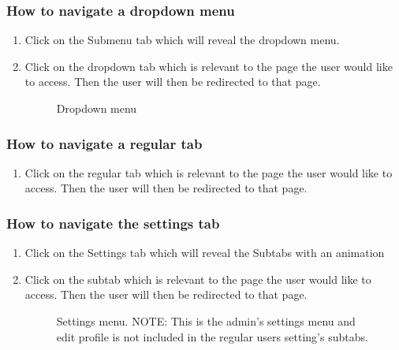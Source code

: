 \documentclass[14pt, a4paper]{article}
\begin{document}
	\subsubsection{How to navigate a dropdown menu}
		\begin{enumerate}
			\item Click on the Submenu tab which will reveal the dropdown menu.
			\item Click on the dropdown tab which is relevant to the page the user would like to access. Then the user will then be redirected to that page.
			\begin{figure}[H]
				\centerline{}
				\caption{Dropdown menu}
				\label{fig:navbar5}
			\end{figure}
		\end{enumerate}
	\subsubsection{How to navigate a regular tab}
		\begin{enumerate}
			\item Click on the regular tab which is relevant to the page the user would like to access. Then the user will then be redirected to that page.
		\end{enumerate}
	\subsubsection{How to navigate the settings tab}
		\begin{enumerate}
			\item Click on the Settings tab which will reveal the Subtabs with an animation
			\item Click on the subtab which is relevant to the page the user would like to access. Then the user will then be redirected to that page.
			\begin{figure}[H]
				\centerline{}
				\caption{Settings menu. NOTE: This is the admin's settings menu and edit profile is not included in the regular users setting's subtabs.}
				\label{fig:navbar6}
			\end{figure}
		\end{enumerate}
\end{document}
